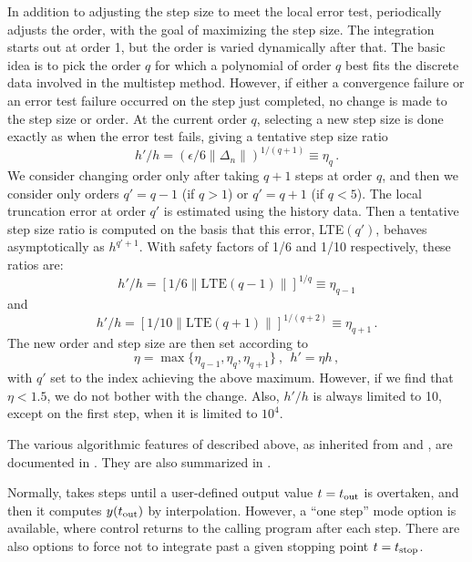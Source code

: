 In addition to adjusting the step size to meet the local error test,
{\cvodes} periodically adjusts the order, with the goal of maximizing the
step size.  The integration starts out at order 1, but the order is varied
dynamically after that.  The basic idea is to pick the order $q$ for
which a polynomial of order $q$ best fits the discrete data involved
in the multistep method.  However, if either a convergence failure or
an error test failure occurred on the step just completed, no change is made
to the step size or order.  At the current order $q$, selecting a
new step size is done exactly as when the error test fails, giving a
tentative step size ratio
\[ h'/h = (\epsilon / 6 \|\Delta_n\| )^{1/(q+1)} \equiv \eta_q \, . \]
We consider changing order only after taking $q+1$ steps at order $q$,
and then we consider only orders $q' = q - 1$ (if $q > 1$) or
$q' = q + 1$ (if $q < 5$).  The local truncation error at order $q'$
is estimated using the history data.  Then a tentative step size ratio
is computed on the basis that this error, LTE$(q')$, behaves
asymptotically as $h^{q'+1}$.  With safety factors of 1/6 and
1/10 respectively, these ratios are:
\[ h'/h = [1 / 6 \|\mbox{LTE}(q-1)\| ]^{1/q} \equiv \eta_{q-1} \]
and
\[ h'/h = [1 / 10 \|\mbox{LTE}(q+1)\| ]^{1/(q+2)} \equiv \eta_{q+1} \, . \]
The new order and step size are then set according to
\[ \eta = \max\{\eta_{q-1},\eta_q,\eta_{q+1}\} ~,~~ h' = \eta h \, , \]
with $q'$ set to the index achieving the above maximum.
However, if we find that $\eta < 1.5$, we do not bother with the
change.  Also, $h'/h$ is always limited to 10, except on the first
step, when it is limited to $10^4$.

The various algorithmic features of {\cvodes} described above, as
inherited from {\vode} and {\vodpk}, are documented in 
\cite{BBH:89,Byr:92,Hin:00}.  They are also summarized in
\cite{HBGLSSW:04}.

Normally, {\cvodes} takes steps until a user-defined output value 
$t = t_{\mbox{\scriptsize out}}$ is overtaken, and then it computes
$y(t_{\mbox{\scriptsize out}})$ by interpolation.  However, a
``one step'' mode option is available, where control returns to the
calling program after each step.  There are also options to force
{\cvodes} not to integrate past a given stopping point 
$t = t_{\mbox{\scriptsize stop}}$.

